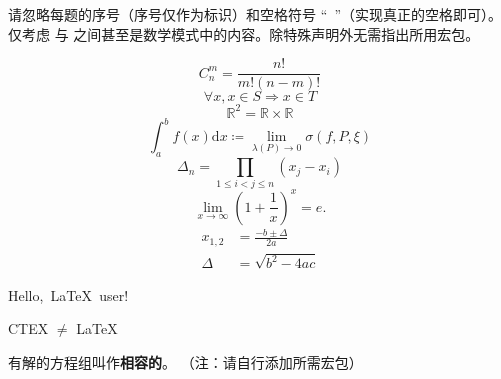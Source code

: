 {\small
请忽略每题的序号（序号仅作为标识）和空格符号 ``\verb*| |''（实现真正的空格即可）。仅考虑 \verb|| 与 \verb|| 之间甚至是数学模式中的内容。除特殊声明外无需指出所用宏包。
}

\begin{equation}
	C_n^m = \frac{n!}{m!(n-m)!}
\end{equation}
\begin{equation}
	\forall x, x \in S \Rightarrow x \in T
\end{equation}
\begin{equation}
	\mathbb{R}^2 = \mathbb{R} \times \mathbb{R}
\end{equation}
\begin{equation}
	\int_a^b f(x) \mathrm{d} x \coloneqq \lim_{\lambda(P) \to 0} \sigma(f, P, \xi)
\end{equation}
\begin{equation}
	\Delta_n = \prod_{1 \leqslant i < j \leqslant n} (x_j - x_i)
\end{equation}
\begin{equation}
	\boxed{\lim_{x \to \infty} (1 + \frac{1}{x})^x = e.}
\end{equation}
\begin{equation}
    \begin{aligned}
        x_{1, 2} &= \frac{-b \pm \Delta}{2a} \\
        \Delta &= \sqrt{b^2 - 4ac}
    \end{aligned}
\end{equation}

Hello,\verb*| |\LaTeX\verb*| |user!

CTEX $\neq$ \LaTeX

有解的方程组叫作\textbf{相容的}。 \hspace{1cm} （注：请自行添加所需宏包）\\ %
